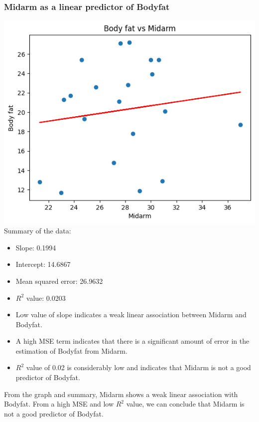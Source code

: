 \documentclass[12pt]{article}
\begin{document}
\subsubsection*{Midarm as a linear predictor of Bodyfat}
\includegraphics*[width=\linewidth]{graph4b3}
Summary of the data:
\begin{itemize}
    \item Slope: 0.1994
    \item Intercept: 14.6867
    \item Mean squared error: 26.9632
    \item \(R^2\) value: 0.0203
    \item Low value of slope indicates a weak linear association between Midarm
    and Bodyfat.
    \item A high MSE term indicates that there is a significant amount of error
    in the estimation of Bodyfat from Midarm.
    \item \(R^2\) value of 0.02 is considerably low and indicates that Midarm is
    not a good predictor of Bodyfat.
\end{itemize}
From the graph and summary, Midarm shows a weak linear association with Bodyfat.
From a high MSE and low \(R^2\) value, we can conclude that Midarm is not a good
predictor of Bodyfat.

\newpage
\end{document}
